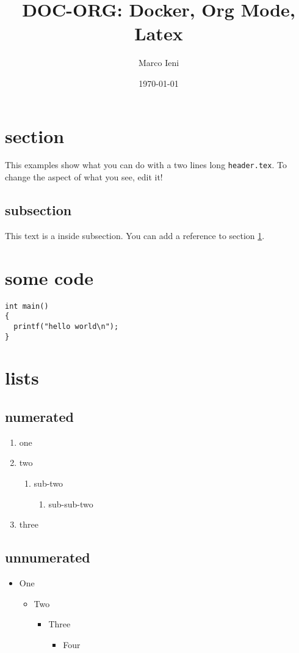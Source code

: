 \documentclass[11pt]{article}
\author{Marco Ieni}
\date{\today}
\title{DOC-ORG: Docker, Org Mode, Latex}
\begin{document}
\maketitle

\section{section}
\label{sec:org77f4136}
This examples show what you can do with a two lines long \texttt{header.tex}.
To change the aspect of what you see, edit it!
\subsection{subsection}
\label{sec:org2b0d554}
This text is a inside subsection. You can add a reference to section \ref{sec:org77f4136}.

\section{some code}
\label{sec:org771bfc5}
\begin{verbatim}
int main()
{
  printf("hello world\n");
}
\end{verbatim}
\section{lists}
\label{sec:orgf29240c}
\subsection{numerated}
\label{sec:org8182dd8}
\begin{enumerate}
\item one
\item two
\begin{enumerate}
\item sub-two
\begin{enumerate}
\item sub-sub-two
\end{enumerate}
\end{enumerate}
\item three
\end{enumerate}

\subsection{unnumerated}
\label{sec:orgb33f75c}
\begin{itemize}
\item One
\begin{itemize}
\item Two
\begin{itemize}
\item Three
\begin{itemize}
\item Four
\end{itemize}
\end{itemize}
\end{itemize}
\end{itemize}
\end{document}
